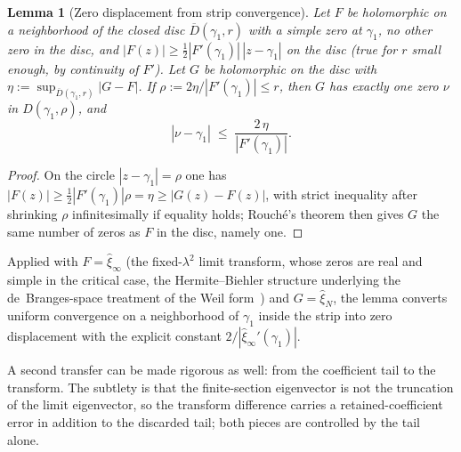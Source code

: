 \documentclass[11pt,a4paper]{article}
\newtheorem{lemma}{Lemma}
\begin{document}
\begin{lemma}[Zero displacement from strip convergence]\label{lem:rouche}
Let $F$ be holomorphic on a neighborhood of the closed disc
$\overline{D}(\gamma_1,r)$ with a simple zero at $\gamma_1$, no other zero in the
disc, and $|F(z)|\ge\tfrac12|F'(\gamma_1)|\,|z-\gamma_1|$ on the disc (true for
$r$ small enough, by continuity of $F'$). Let $G$ be holomorphic on the disc
with $\eta:=\sup_{\overline{D}(\gamma_1,r)}|G-F|$. If
$\rho:=2\eta/|F'(\gamma_1)|\le r$, then $G$ has exactly one zero $\nu$ in
$D(\gamma_1,\rho)$, and
\[
  |\nu-\gamma_1|\;\le\;\frac{2\,\eta}{|F'(\gamma_1)|}.
\]
\end{lemma}
\begin{proof}
On the circle $|z-\gamma_1|=\rho$ one has
$|F(z)|\ge\tfrac12|F'(\gamma_1)|\rho=\eta\ge|G(z)-F(z)|$, with strict inequality
after shrinking $\rho$ infinitesimally if equality holds; Rouch\'e's theorem then
gives $G$ the same number of zeros as $F$ in the disc, namely one.
\end{proof}

Applied with $F=\widehat\xi_\infty$ (the fixed-$\lambda^2$ limit transform,
whose zeros are real and simple in the critical case, the Hermite--Biehler
structure underlying the de~Branges-space treatment of the Weil
form~\cite{SuzukiHilbert,SuzukiJLMS}) and $G=\widehat\xi_N$, the lemma converts
uniform convergence on a neighborhood of $\gamma_1$ inside the strip into zero
displacement with the explicit constant $2/|\widehat\xi_\infty'(\gamma_1)|$.

A second transfer can be made rigorous as well: from the coefficient tail to
the transform. The subtlety is that the finite-section eigenvector is not the
truncation of the limit eigenvector, so the transform difference carries a
retained-coefficient error in addition to the discarded tail; both pieces are
controlled by the tail alone.
\end{document}
